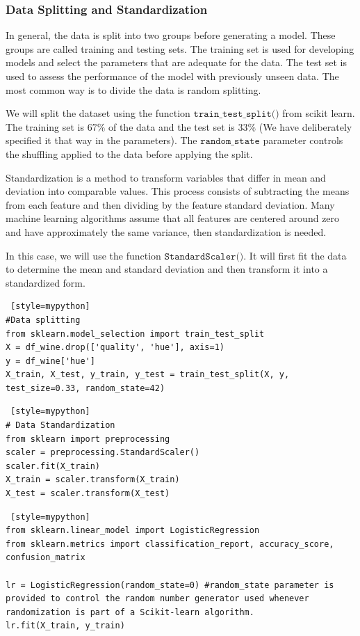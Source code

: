 \subsubsection{Data Splitting and Standardization}
\label{Data_split}
In general, the data is split into two groups before generating a model. These groups are called training and testing sets. The training set is used for developing models and select the parameters that are adequate for the data. The test set is used to assess the performance of the model with previously unseen data. The most common way is to divide the data is random splitting.

We will split the dataset using the function $\texttt{train\_test\_split()}$ from scikit learn. The training set is $67\%$ of the data and the test set is $33\%$ (We have deliberately specified it that way in the parameters). The $\texttt{random\_state}$ parameter controls the shuffling applied to the data before applying the split.

Standardization is a method to transform variables that differ in mean and deviation into comparable values. This process consists of subtracting the means from each feature and then dividing by the feature standard deviation. Many machine learning algorithms assume that all features are centered around zero and have approximately the same variance, then standardization is needed.

In this case, we will use the function $\texttt{StandardScaler()}$. It will first fit the data to determine the mean and standard deviation and then transform it into a standardized form. 

\begin{lstlisting} [style=mypython]
#Data splitting
from sklearn.model_selection import train_test_split
X = df_wine.drop(['quality', 'hue'], axis=1)
y = df_wine['hue']
X_train, X_test, y_train, y_test = train_test_split(X, y, test_size=0.33, random_state=42)    
\end{lstlisting}


\begin{lstlisting} [style=mypython]
# Data Standardization
from sklearn import preprocessing
scaler = preprocessing.StandardScaler()
scaler.fit(X_train)
X_train = scaler.transform(X_train)
X_test = scaler.transform(X_test)    
\end{lstlisting}

\begin{lstlisting} [style=mypython]
from sklearn.linear_model import LogisticRegression
from sklearn.metrics import classification_report, accuracy_score, confusion_matrix

lr = LogisticRegression(random_state=0) #random_state parameter is provided to control the random number generator used whenever randomization is part of a Scikit-learn algorithm.
lr.fit(X_train, y_train)   
\end{lstlisting}

